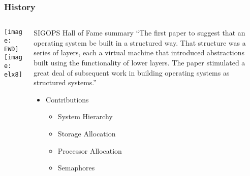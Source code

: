 \begin{frame}[plain]
	\frametitle{History}
	
	
	
	\begin{columns}
		
		\begin{column}{.4\textwidth}
			\centering
			\texttt{[image: EWD]}
			\texttt{[image: elx8]}
			
			
			
		\end{column}
		
		\begin{column}{.6\textwidth}
			
	\begin{block}{SIGOPS Hall of Fame summary}
“The first paper to suggest that an operating system be built in a structured way. That structure was a series of layers, each a virtual machine that introduced abstractions built using the functionality of lower layers. The paper stimulated a great deal of subsequent work in building operating systems as structured systems.”
\end{block} 
	\large
	\begin{itemize}
	\item Contributions
	\begin{itemize}
		\item System Hierarchy					
		\item Storage Allocation
		\item Processor Allocation
		
		\item Semaphores
		
	\end{itemize}
	
\end{itemize}	
			
		\end{column}
		
		
	\end{columns}
	
	
\end{frame}

